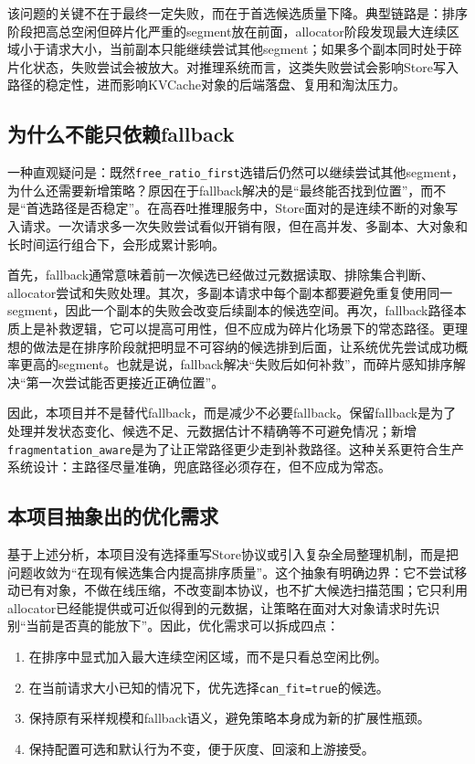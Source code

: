 \documentclass[UTF8,zihao=-4,a4paper]{ctexart}
\newcommand{\artifact}[1]{\texttt{#1}}
\newcommand{\strategy}{\texttt{fragmentation\_aware}}
\newcommand{\baseline}{\texttt{free\_ratio\_first}}
\begin{document}
该问题的关键不在于最终一定失败，而在于首选候选质量下降。典型链路是：排序阶段把高总空闲但碎片化严重的segment放在前面，allocator阶段发现最大连续区域小于请求大小，当前副本只能继续尝试其他segment；如果多个副本同时处于碎片化状态，失败尝试会被放大。对推理系统而言，这类失败尝试会影响Store写入路径的稳定性，进而影响KVCache对象的后端落盘、复用和淘汰压力。

\subsection{为什么不能只依赖fallback}

一种直观疑问是：既然\baseline{}选错后仍然可以继续尝试其他segment，为什么还需要新增策略？原因在于fallback解决的是“最终能否找到位置”，而不是“首选路径是否稳定”。在高吞吐推理服务中，Store面对的是连续不断的对象写入请求。一次请求多一次失败尝试看似开销有限，但在高并发、多副本、大对象和长时间运行组合下，会形成累计影响。

首先，fallback通常意味着前一次候选已经做过元数据读取、排除集合判断、allocator尝试和失败处理。其次，多副本请求中每个副本都要避免重复使用同一segment，因此一个副本的失败会改变后续副本的候选空间。再次，fallback路径本质上是补救逻辑，它可以提高可用性，但不应成为碎片化场景下的常态路径。更理想的做法是在排序阶段就把明显不可容纳的候选排到后面，让系统优先尝试成功概率更高的segment。也就是说，fallback解决“失败后如何补救”，而碎片感知排序解决“第一次尝试能否更接近正确位置”。

因此，本项目并不是替代fallback，而是减少不必要fallback。保留fallback是为了处理并发状态变化、候选不足、元数据估计不精确等不可避免情况；新增\strategy{}是为了让正常路径更少走到补救路径。这种关系更符合生产系统设计：主路径尽量准确，兜底路径必须存在，但不应成为常态。

\subsection{本项目抽象出的优化需求}

基于上述分析，本项目没有选择重写Store协议或引入复杂全局整理机制，而是把问题收敛为“在现有候选集合内提高排序质量”。这个抽象有明确边界：它不尝试移动已有对象，不做在线压缩，不改变副本协议，也不扩大候选扫描范围；它只利用allocator已经能提供或可近似得到的元数据，让策略在面对大对象请求时先识别“当前是否真的能放下”。因此，优化需求可以拆成四点：

\begin{enumerate}
  \item 在排序中显式加入最大连续空闲区域，而不是只看总空闲比例。
  \item 在当前请求大小已知的情况下，优先选择\artifact{can\_fit=true}的候选。
  \item 保持原有采样规模和fallback语义，避免策略本身成为新的扩展性瓶颈。
  \item 保持配置可选和默认行为不变，便于灰度、回滚和上游接受。
\end{enumerate}
\end{document}

